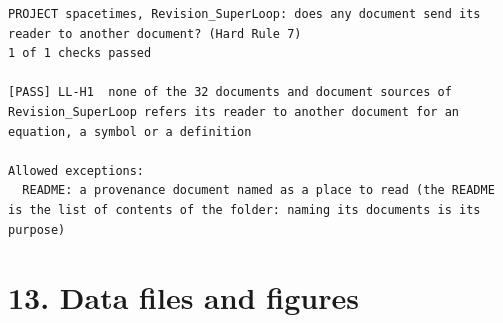 \documentclass[
  10pt,
]{article}
\begin{document}
\begin{verbatim}
PROJECT spacetimes, Revision_SuperLoop: does any document send its reader to another document? (Hard Rule 7)
1 of 1 checks passed

[PASS] LL-H1  none of the 32 documents and document sources of Revision_SuperLoop refers its reader to another document for an equation, a symbol or a definition

Allowed exceptions:
  README: a provenance document named as a place to read (the README is the list of contents of the folder: naming its documents is its purpose)
\end{verbatim}

\hypertarget{data-files-and-figures}{%
\section{13. Data files and figures}\label{data-files-and-figures}}
\end{document}

